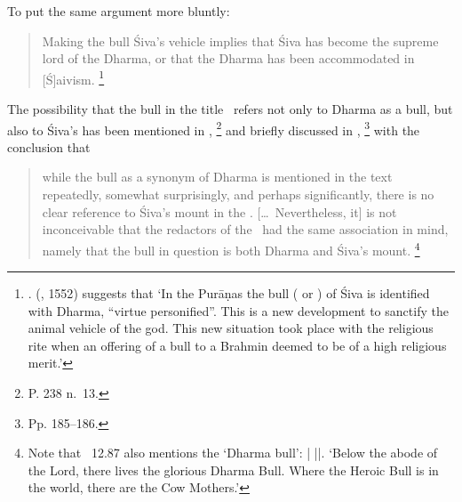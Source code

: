 \noindent
To put the same argument more bluntly:

\begin{quote}
Making the bull Śiva's vehicle implies that Śiva has become
the supreme lord of the Dharma, or that the Dharma has 
been accommodated in [Ś]aivism.%
	\footnote{.
	\citeauthor{bhattacharya_nandin_1977} 		
			(\citeyear{bhattacharya_nandin_1977}, {1552}) 
			suggests that `In the Purāṇas the bull
		( or 
		) 
	of Śiva is identified with Dharma, ``virtue personified''. 
		This is a new development to sanctify the animal 
		vehicle of the god. This new situation took place with the 		
		religious rite when an offering of a bull to a Brahmin   
		deemed to be	of a high religious merit.'}
\end{quote}

\noindent
The possibility that the bull in the title \Vss\ refers 
not only to Dharma as a bull, but also
to Śiva's  has been mentioned
in\linebreak
{},%
        \footnote{P. 238 n.~13.}
and briefly discussed in ,%
        \footnote{Pp. 185--186.} 
with the conclusion that 

\begin{quote} 
while the bull as a synonym of Dharma is mentioned in the text repeatedly,
somewhat surprisingly, and perhaps significantly, there is no
clear reference to Śiva's mount in the \Vss. [\dots\ Nevertheless, it]
is not inconceivable that the redactors of the \Vss\ had
the same association in mind, namely that the bull in 
question is both Dharma and Śiva's mount.%
	\footnote{Note that \SDhU\  12.87
				also mentions the `Dharma bull':
	     |
    	 ||. 
                `Below the abode of the Lord, there lives the glorious Dharma Bull.
                 Where the Heroic Bull is in the world, there are the Cow Mothers.'}
\end{quote} 


